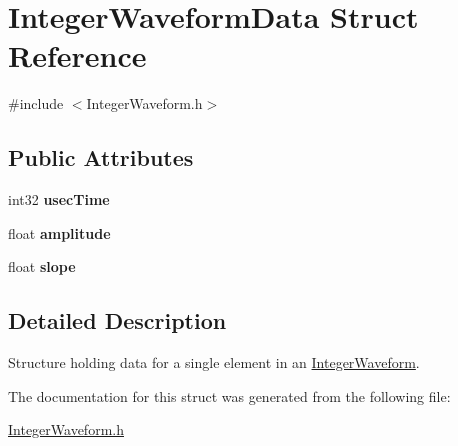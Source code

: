 \hypertarget{structIntegerWaveformData}{
\section{IntegerWaveformData Struct Reference}
\label{structIntegerWaveformData}
}


{\ttfamily \#include $<$IntegerWaveform.h$>$}

\subsection*{Public Attributes}
\begin{DoxyCompactItemize}
\item 
\hypertarget{structIntegerWaveformData_aeec660fc909b067e46c8b29528729561}{
int32 {\bfseries usecTime}}
\label{structIntegerWaveformData_aeec660fc909b067e46c8b29528729561}

\item 
\hypertarget{structIntegerWaveformData_a5c7b0a92aa8cc11f0415c67ea5737eb0}{
float {\bfseries amplitude}}
\label{structIntegerWaveformData_a5c7b0a92aa8cc11f0415c67ea5737eb0}

\item 
\hypertarget{structIntegerWaveformData_adbf9d041356107a09e25e402097b33b1}{
float {\bfseries slope}}
\label{structIntegerWaveformData_adbf9d041356107a09e25e402097b33b1}

\end{DoxyCompactItemize}


\subsection{Detailed Description}
Structure holding data for a single element in an \hyperlink{classIntegerWaveform}{IntegerWaveform}. 

The documentation for this struct was generated from the following file:\begin{DoxyCompactItemize}
\item 
\hyperlink{IntegerWaveform_8h}{IntegerWaveform.h}\end{DoxyCompactItemize}
